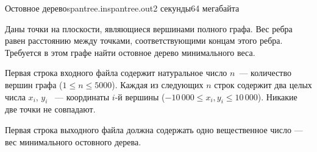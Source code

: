 \begin{problem}{Остовное дерево}{spantree.in}{spantree.out}{2 секунды}{64 мегабайта}

Даны точки на плоскости, являющиеся вершинами полного графа. Вес ребра равен
расстоянию между точками, соответствующими концам этого ребра.
Требуется в этом графе найти остовное дерево минимального веса.
                                                                              
\InputFile

Первая строка входного файла содержит натуральное число $n$~--- 
количество вершин графа ($1 \le n \le 5000$). 
Каждая из следующих $n$ строк содержит два целых числа
$x_i$, $y_i$ ~--- координаты $i$-й вершины ($-10\,000 \le x_i, y_i \le 10\,000$).
Никакие две точки не совпадают.

\OutputFile

Первая строка выходного файла должна содержать одно вещественное число --- вес минимального остовного дерева.

\Examples

\begin{example}%
%
\end{example}

\end{problem}
